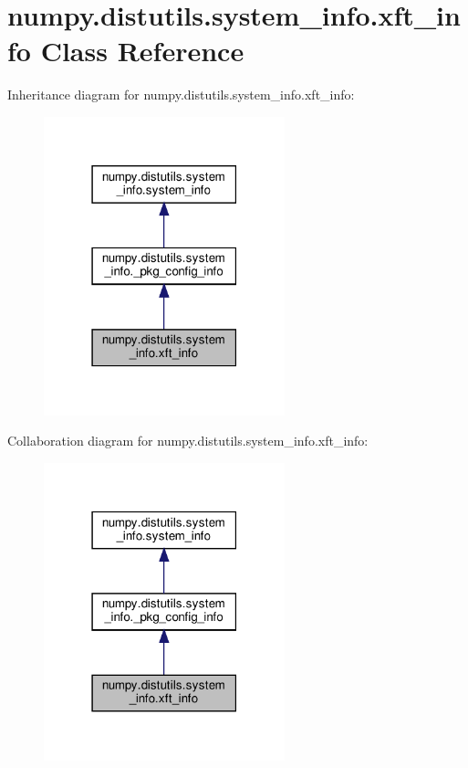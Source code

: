 \hypertarget{classnumpy_1_1distutils_1_1system__info_1_1xft__info}{}\section{numpy.\+distutils.\+system\+\_\+info.\+xft\+\_\+info Class Reference}
\label{classnumpy_1_1distutils_1_1system__info_1_1xft__info}


Inheritance diagram for numpy.\+distutils.\+system\+\_\+info.\+xft\+\_\+info\+:
\nopagebreak
\begin{figure}[H]
\begin{center}
\leavevmode
\includegraphics[width=198pt]{classnumpy_1_1distutils_1_1system__info_1_1xft__info__inherit__graph}
\end{center}
\end{figure}


Collaboration diagram for numpy.\+distutils.\+system\+\_\+info.\+xft\+\_\+info\+:
\nopagebreak
\begin{figure}[H]
\begin{center}
\leavevmode
\includegraphics[width=198pt]{classnumpy_1_1distutils_1_1system__info_1_1xft__info__coll__graph}
\end{center}
\end{figure}
